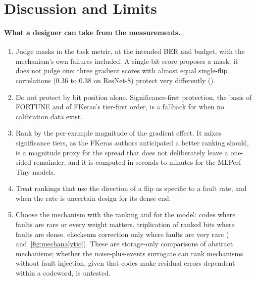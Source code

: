 \section{Discussion and Limits}\label{sec:discussion}
\paragraph{What a designer can take from the measurements.}
\begin{enumerate}
\item Judge masks in the task metric, at the intended BER and budget, with the mechanism's own failures included. A single-bit score proposes a mask; it does not judge one: three gradient scores with almost equal single-flip correlations (0.36 to 0.38 on ResNet-8) protect very differently ().
\item Do not protect by bit position alone. Significance-first protection, the basis of FORTUNE and of FKeras's tier-first order, is a fallback for when no calibration data exist.
\item Rank by the per-example magnitude of the gradient effect. It mixes significance tiers, as the FKeras authors anticipated a better ranking should, is a magnitude proxy for the spread that does not deliberately leave a one-sided remainder, and it is computed in seconds to minutes for the MLPerf Tiny models.
\item Treat rankings that use the direction of a flip as specific to a fault rate, and when the rate is uncertain design for its dense end.
\item Choose the mechanism with the ranking and for the model: codes where faults are rare or every weight matters, triplication of ranked bits where faults are dense, checksum correction only where faults are very rare ( and~\ref{fig:mechanalytic}). These are storage-only comparisons of abstract mechanisms; whether the noise-plus-events surrogate can rank mechanisms without fault injection, given that codes make residual errors dependent within a codeword, is untested.
\end{enumerate}


